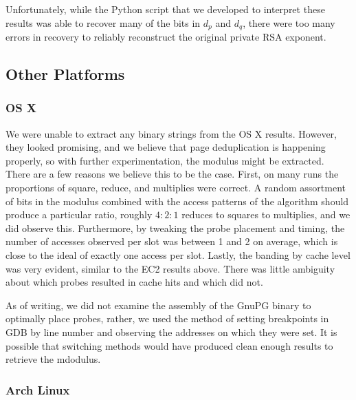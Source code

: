 \documentclass[11pt]{llncs}
\begin{document}
Unfortunately, while the Python script that we developed to interpret these
results was able to recover many of the bits in $d_p$ and $d_q$, there were too
many errors in recovery to reliably reconstruct the original private RSA
exponent.


\subsection{Other Platforms}

\subsubsection{OS X}

We were unable to extract any binary strings from the OS X results. However,
they looked promising, and we believe that page deduplication is happening
properly, so with further experimentation, the modulus might be extracted. There
are a few reasons we believe this to be the case. First, on many runs the
proportions of square, reduce, and multiplies were correct. A random assortment
of bits in the modulus combined with the access patterns of the algorithm should
produce a particular ratio, roughly $4:2:1$ reduces to squares to multiplies,
and we did observe this. Furthermore, by tweaking the probe placement and
timing, the number of accesses observed per slot was between 1 and 2 on average,
which is close to the ideal of exactly one access per slot. Lastly, the banding
by cache level was very evident, similar to the EC2 results above. There was
little ambiguity about which probes resulted in cache hits and which did not.

As of writing, we did not examine the assembly of the GnuPG binary to optimally
place probes, rather, we used the method of setting breakpoints in GDB by line
number and observing the addresses on which they were set. It is possible that
switching methods would have produced clean enough results to retrieve the
mdodulus.

\subsubsection{Arch Linux}
\end{document}
